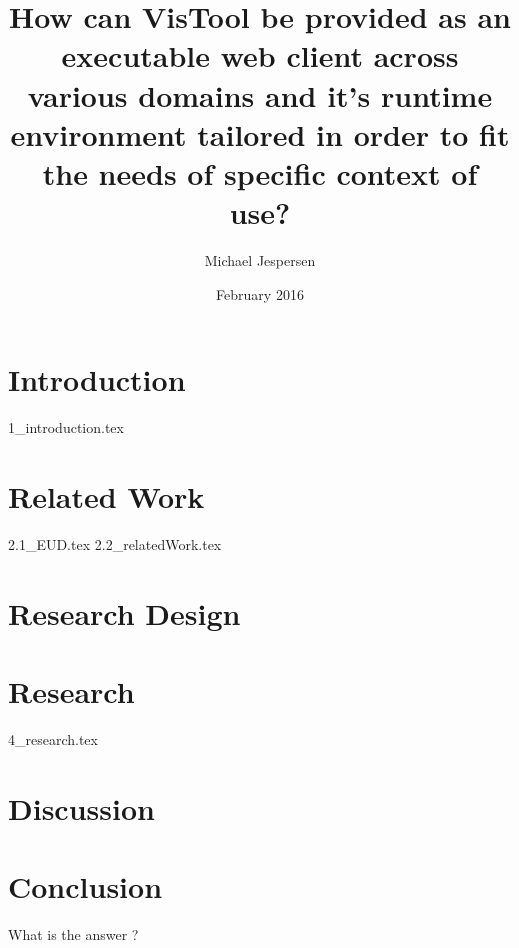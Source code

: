 \documentclass[12pt, a4paper]{article}
\title{How can VisTool be provided as an executable web client across various domains and it's runtime environment tailored in order to fit the needs of specific context of use?}
\author{Michael Jespersen}
\date{February 2016}
\begin{document}
\maketitle

\tableofcontents


\section{Introduction}
{1_introduction.tex}

\section{Related Work}
{2.1_EUD.tex}
{2.2_relatedWork.tex}

\section{Research Design}

\section{Research}
{4_research.tex}


\section{Discussion}

\section{Conclusion}
What is the answer ?

\clearpage







\end{document}
